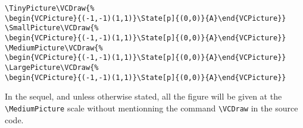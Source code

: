 \documentclass[11pt,twoside]{article}
\newlength{\parindenttemp} %
\newcommand{\smallskipneg}{\vspace*{-1ex}} %
\newcommand{\noi}{\noindent}
\newlength{\jsIndent}%
\newlength{\ColSource}%
\newlength{\ColFigur}%
\begin{document}
\noi 
\hspace*{-\jsIndent}
\begin{minipage}[c]{\ColFigur-.7cm}%
\par\vspace*{0mm}%
\begin{center}
\TinyPicture{}
\SmallPicture{}
\MediumPicture{}
\LargePicture{}
\end{center}
\end{minipage}%
\hspace*{1.2em}%
\begin{minipage}[c]{\ColSource+.7cm}
\setlength{\parindent}{\parindenttemp}%
\par\vspace*{0mm}%
\footnotesize
\begin{verbatim}
\TinyPicture\VCDraw{%
\begin{VCPicture}{(-1,-1)(1,1)}\State[p]{(0,0)}{A}\end{VCPicture}}
\SmallPicture\VCDraw{%
\begin{VCPicture}{(-1,-1)(1,1)}\State[p]{(0,0)}{A}\end{VCPicture}}
\MediumPicture\VCDraw{%
\begin{VCPicture}{(-1,-1)(1,1)}\State[p]{(0,0)}{A}\end{VCPicture}}
\LargePicture\VCDraw{%
\begin{VCPicture}{(-1,-1)(1,1)}\State[p]{(0,0)}{A}\end{VCPicture}}
\end{verbatim}
\normalsize
\end{minipage}%
\HideFrame

\noi
In the sequel, and unless otherwise stated,
all the figure will be given at the \verb+\MediumPicture+ 
scale without mentionning the command \verb+\VCDraw+ in the source code.

\end{document}
